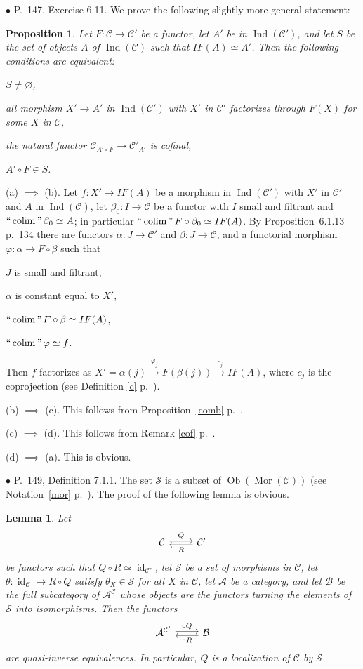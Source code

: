 \documentclass[12pt]{article}
\newtheorem{lem}[thm]{Lemma}
\newtheorem{prop}[thm]{Proposition}
\theoremstyle{remark}%
\newcommand{\bu}{\bullet}
\newcommand{\n}{\noindent}
\newcommand{\cc}{\mathcal}
\newcommand{\A}{\mathcal A}
\newcommand{\B}{\mathcal B}
\newcommand{\C}{\mathcal C}
\newcommand{\p}{\varphi}
\newcommand{\xr}{\xrightarrow}
\newcommand{\pr}{Proposition}
\DeclareMathOperator*{\coli}{colim}
\DeclareMathOperator*{\ic}{``\coli"}
\DeclareMathOperator{\id}{id}
\DeclareMathOperator{\Ind}{Ind}
\DeclareMathOperator{\Mor}{Mor}
\DeclareMathOperator{\Ob}{Ob}
\begin{document}

\n$\bu$ P.~147, Exercise 6.11. We prove the following slightly more general statement: 
% 
\begin{prop}
%
Let $F:\cc C\to\cc C'$ be a functor, let $A'$ be in $\Ind(\cc C')$, and let $S$ be the set of objects $A$ of $\Ind(\cc C)$ such that $IF(A)\simeq A'$. Then the following conditions are equivalent: 

\n{\em(a)} $S\neq\varnothing$, 

\n{\em(b)} all morphism $X'\to A'$ in $\Ind(\cc C')$ with $X'$ in $\cc C'$ factorizes through $F(X)$ for some $X$ in $\cc C$, 

\n{\em(c)} the natural functor $\cc C_{A'\circ F}\to\cc C'_{A'}$ is cofinal, 

\n{\em(d)} $A'\circ F\in S$.
%
\end{prop}
%
\n{\em Proof.} 

\n(a) $\implies$ (b). Let $f:X'\to IF(A)$ be a morphism in $\Ind(\cc C')$ with $X'$ in $\cc C'$ and $A$ in $\Ind(\cc C)$, let $\beta_0:I\to\cc C$ be a functor with $I$ small and filtrant and $\ic\beta_0\simeq A$; in particular $\ic F\circ\beta_0\simeq IF(A)$. By \pr\ 6.1.13 p.~134 there are functors $\alpha:J\to\cc C'$ and $\beta:J\to\cc C$, and a functorial morphism $\p:\alpha\to F\circ\beta$ such that 

$J$ is small and filtrant, 

$\alpha$ is constant equal to $X'$, 

$\ic F\circ\beta\simeq IF(A)$, 

$\ic\p\simeq f$. 

\n Then $f$ factorizes as $X'=\alpha(j)\xr{\p_j}F(\beta(j))\xr{c_j}IF(A)$, where $c_j$ is the coprojection (see Definition \ref{c} p.~\pageref{c}). 

\n(b) $\implies$ (c). This follows from \pr\ \ref{comb} p.~\pageref{comb}. 

\n(c) $\implies$ (d). This follows from Remark \ref{cof} p.~\pageref{cof}. 

\n(d) $\implies$ (a). This is obvious. 


\n$\bu$ P.~149, Definition 7.1.1. The set $\cc S$ is a subset of $\Ob(\Mor(\C))$ (see Notation~\ref{mor} p.~\pageref{mor}). The proof of the following lemma is obvious. 
%
\begin{lem}\label{711}
%
Let 
$$
\begin{tikzcd}\C\ar[yshift=.5ex]{r}{Q}&\C'\ar[yshift=-.4ex]{l}{R}\end{tikzcd}
$$ 
be functors such that $Q\circ R\simeq\id_{\C'}$, let $\cc S$ be a set of morphisms in $\C$, let $\theta:\id_\C\to R\circ Q$ satisfy $\theta_X\in\cc S$ for all $X$ in $\C$, let $\A$ be a category, and let $\B$ be the full subcategory of $\A^\C$ whose objects are the functors turning the elements of $\cc S$ into isomorphisms. Then the functors 
$$
\begin{tikzcd}\A^{\C'}\ar[yshift=.4ex]{r}{\circ Q}&\B\ar[yshift=-.5ex]{l}{\circ R}\end{tikzcd}
$$ 
are quasi-inverse equivalences. In particular, $Q$ is a localization of $\C$ by $\cc S$.
%
\end{lem}
\end{document}
